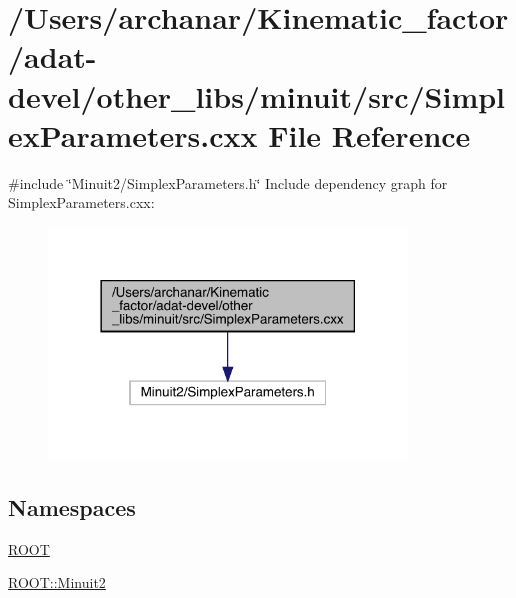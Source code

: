 \hypertarget{adat-devel_2other__libs_2minuit_2src_2SimplexParameters_8cxx}{}\section{/\+Users/archanar/\+Kinematic\+\_\+factor/adat-\/devel/other\+\_\+libs/minuit/src/\+Simplex\+Parameters.cxx File Reference}
\label{adat-devel_2other__libs_2minuit_2src_2SimplexParameters_8cxx}
{\ttfamily \#include \char`\"{}Minuit2/\+Simplex\+Parameters.\+h\char`\"{}}\newline
Include dependency graph for Simplex\+Parameters.\+cxx\+:
\nopagebreak
\begin{figure}[H]
\begin{center}
\leavevmode
\includegraphics[width=270pt]{dc/d3c/adat-devel_2other__libs_2minuit_2src_2SimplexParameters_8cxx__incl}
\end{center}
\end{figure}
\subsection*{Namespaces}
\begin{DoxyCompactItemize}
\item 
 \mbox{\hyperlink{namespaceROOT}{R\+O\+OT}}
\item 
 \mbox{\hyperlink{namespaceROOT_1_1Minuit2}{R\+O\+O\+T\+::\+Minuit2}}
\end{DoxyCompactItemize}
